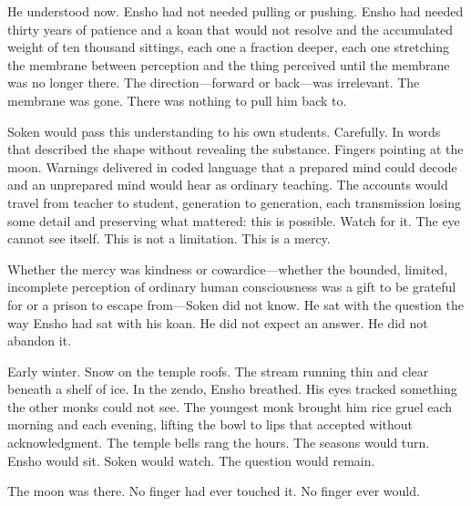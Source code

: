 He understood now. Ensho had not needed pulling or pushing. Ensho had needed thirty years of patience and a koan that would not resolve and the accumulated weight of ten thousand sittings, each one a fraction deeper, each one stretching the membrane between perception and the thing perceived until the membrane was no longer there. The direction---forward or back---was irrelevant. The membrane was gone. There was nothing to pull him back to.

Soken would pass this understanding to his own students. Carefully. In words that described the shape without revealing the substance. Fingers pointing at the moon. Warnings delivered in coded language that a prepared mind could decode and an unprepared mind would hear as ordinary teaching. The accounts would travel from teacher to student, generation to generation, each transmission losing some detail and preserving what mattered: this is possible. Watch for it. The eye cannot see itself. This is not a limitation. This is a mercy.

Whether the mercy was kindness or cowardice---whether the bounded, limited, incomplete perception of ordinary human consciousness was a gift to be grateful for or a prison to escape from---Soken did not know. He sat with the question the way Ensho had sat with his koan. He did not expect an answer. He did not abandon it.

Early winter. Snow on the temple roofs. The stream running thin and clear beneath a shelf of ice. In the zendo, Ensho breathed. His eyes tracked something the other monks could not see. The youngest monk brought him rice gruel each morning and each evening, lifting the bowl to lips that accepted without acknowledgment. The temple bells rang the hours. The seasons would turn. Ensho would sit. Soken would watch. The question would remain.

The moon was there. No finger had ever touched it. No finger ever would.
